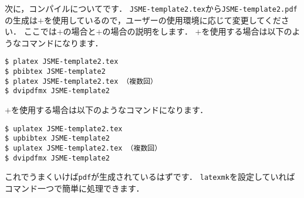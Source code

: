 次に，コンパイルについてです．
\verb|JSME-template2.tex|から\verb|JSME-template2.pdf|の生成は\upLaTeX{}$+$\upBibTeX{}を使用しているので，ユーザーの使用環境に応じて変更してください．
ここでは\pLaTeX{}$+$\pBibTeX{}の場合と\upLaTeX{}$+$\upBibTeX{}の場合の説明をします．
\pLaTeX{}$+$\pBibTeX{}を使用する場合は以下のようなコマンドになります．
\begin{tcolorbox}[enhanced, title=\pLaTeX{}$+$\pBibTeX{}, drop fuzzy shadow]
\begin{verbatim}
$ platex JSME-template2.tex
$ pbibtex JSME-template2
$ platex JSME-template2.tex （複数回）
$ dvipdfmx JSME-template2
\end{verbatim}
\end{tcolorbox}
\noindent
\upLaTeX{}$+$\upBibTeX{}を使用する場合は以下のようなコマンドになります．
\begin{tcolorbox}[enhanced, title=\upLaTeX{}$+$\upBibTeX{}, drop fuzzy shadow]
\begin{verbatim}
$ uplatex JSME-template2.tex
$ upbibtex JSME-template2
$ uplatex JSME-template2.tex （複数回）
$ dvipdfmx JSME-template2
\end{verbatim}
\end{tcolorbox}
\noindent
これでうまくいけば\verb|pdf|が生成されているはずです．
\verb|latexmk|を設定していればコマンド一つで簡単に処理できます．